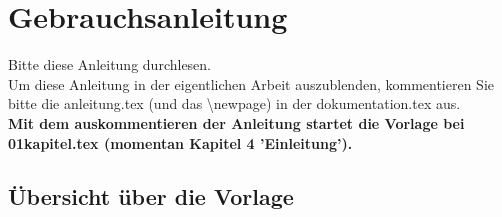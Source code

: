 \chapter{Gebrauchsanleitung}

Bitte diese Anleitung durchlesen. \\

Um diese Anleitung in der eigentlichen Arbeit auszublenden, kommentieren Sie bitte die anleitung.tex (und das \textbackslash newpage) in der dokumentation.tex aus. \\
\textbf{Mit dem auskommentieren der Anleitung startet die Vorlage bei 01kapitel.tex (momentan Kapitel 4 'Einleitung').}

\section{Übersicht über die Vorlage}

